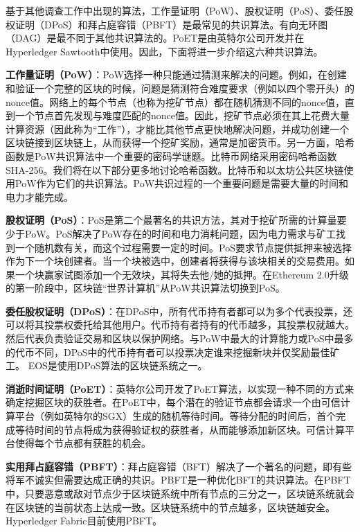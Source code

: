 \begin{translation}
基于其他调查工作中出现的算法\cite{art2,art3,art26,art27,art28,art29,art30,art31,art32}，工作量证明（PoW）、股权证明（PoS）、委任股权证明（DPoS）和拜占庭容错（PBFT）是最常见的共识算法。有向无环图（DAG）是最不同于其他共识算法的。PoET是由英特尔公司开发并在Hyperledger Sawtooth中使用。因此，下面将进一步介绍这六种共识算法。

\textbf{工作量证明（PoW）}：PoW选择一种只能通过猜测来解决的问题。例如，在创建和验证一个完整的区块的时候，问题是猜测符合难度要求（例如以四个零开头）的nonce值。网络上的每个节点（也称为挖矿节点）都在随机猜测不同的nonce值，直到一个节点首先发现与难度匹配的nonce值。因此，挖矿节点必须在其上花费大量计算资源（因此称为“工作”），才能比其他节点更快地解决问题，并成功创建一个区块链接到区块链上，从而获得一个挖矿奖励，通常是加密货币。另一方面，哈希函数是PoW共识算法中一个重要的密码学谜题。比特币网络采用密码哈希函数SHA-256\cite{art8}。我们将在以下部分更多地讨论哈希函数。比特币和以太坊公共区块链使用PoW作为它们的共识算法。PoW共识过程的一个重要问题是需要大量的时间和电力才能完成。

\textbf{股权证明（PoS）}：PoS\cite{art12,art33}是第二个最著名的共识方法，其对于挖矿所需的计算量要少于PoW。PoS解决了PoW存在的时间和电力消耗问题，因为电力需求与矿工找到一个随机数有关，而这个过程需要一定的时间。PoS要求节点提供抵押来被选择作为下一个块创建者。当一个块被选中，创建者将获得与该块相关的交易费用。如果一个块赢家试图添加一个无效块，其将失去他/她的抵押。在Ethereum 2.0升级的第一阶段中，区块链“世界计算机”从PoW共识算法切换到PoS。

\textbf{委任股权证明（DPoS）}：在DPoS中，所有代币持有者都可以为多个代表投票，还可以将其投票权委托给其他用户。代币持有者持有的代币越多，其投票权就越大。然后代表负责验证交易和区块以保护网络\cite{art13}。与PoW中最大的计算能力或PoS中最多的代币不同，DPoS中的代币持有者可以投票决定谁来挖掘新块并仅奖励最佳矿工。 EOS是使用DPoS算法的区块链系统之一\cite{art34}。

\textbf{消逝时间证明（PoET）}：英特尔公司开发了PoET算法，以实现一种不同的方式来确定挖掘区块的获胜者\cite{art14}。在PoET中，每个潜在的验证节点都会请求一个由可信计算平台（例如英特尔的SGX）生成的随机等待时间。等待分配的时间后，首个完成等待时间的节点将成为获得验证权的获胜者，从而能够添加新区块。可信计算平台使得每个节点都有获胜的机会\cite{art35}。

\textbf{实用拜占庭容错（PBFT）}：拜占庭容错（BFT）解决了一个著名的问题，即有些将军不诚实但需要达成正确的共识。PBFT是一种优化BFT的共识算法\cite{art16}。在PBFT中，只要恶意或敌对节点少于区块链系统中所有节点的三分之一，区块链系统就会在区块链的当前状态上达成一致。区块链系统中的节点越多，区块链越安全。Hyperledger Fabric目前使用PBFT。


\end{translation}

